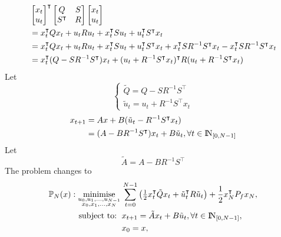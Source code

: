 \documentclass[a4paper,11pt,reqno]{amsart}
\newcommand{\N}{{\rm I\!N}}
\newcommand{\tran}{\intercal}
\DeclareMathOperator*{\minimise}{minimise}
\begin{document}
\begin{align}
    &
    \begin{bmatrix}
        x_t\\
        u_t
    \end{bmatrix}^{\tran}
    \begin{bmatrix}
        Q&S\\
        S^{\tran}&R
    \end{bmatrix}
    \begin{bmatrix}
        x_t\\
        u_t
    \end{bmatrix}\notag\\
    &=x_t^{\tran}Qx_t+u_tRu_t+x_t^{\tran}Su_t+u_t^{\tran}S^{\tran}x_t\notag\\
    &=x_t^{\tran}Qx_t+u_tRu_t+x_t^{\tran}Su_t+u_t^{\tran}S^{\tran}x_t+x_t^{\tran}SR^{-1}S^{\tran}x_t-x_t^{\tran}SR^{-1}S^{\tran}x_t\notag\\
    &=x_t^{\tran}(Q-SR^{-1}S^{\tran})x_t+(u_t+R^{-1}S^{\tran}x_t)^{\tran}R(u_t+R^{-1}S^{\tran}x_t)
    \label{eq:P_N_matrix_rewrite}
\end{align}
Let
\begin{equation}
    \begin{cases}
        \tilde{Q}=Q-SR^{-1}S^{\tran}\\
        \tilde{u}_t=u_t+R^{-1}S^{\tran}x_t
    \end{cases}
    \label{eq:tilde_Q_u}
\end{equation}
\begin{align}
    x_{t+1}&=Ax+B(\tilde{u}_t-R^{-1}S^{\tran}x_t)\notag\\
    &=(A-BR^{-1}S^{\tran})x_t+B\tilde{u}_t, \forall t\in\N_{[0, N-1]}
    \label{eq:tilde_x}
\end{align}
Let
\begin{equation}
    \tilde{A}=A-BR^{-1}S^{\tran}
    \label{eq:tilde_A}
\end{equation}
The problem changes to 
\begin{subequations}
    \begin{align}
        \mathbb{P}_N(x): \minimise_{\substack{u_0,u_1,\ldots,u_{N-1}\\ x_0,x_1,\ldots,x_N}} \,
         & \sum_{t=0}^{N-1}\left(\textstyle\frac{1}{2}
         x_t^{\tran}\tilde{Q}x_t+\tilde{u}_t^{\tran}R\tilde{u}_t\right) 
         +\frac{1}{2}x_N^{\tran}P_fx_N,
        \\
        \text{subject to: }\,
         & x_{t+1} = \tilde{A}x_t+B\tilde{u}_t, \forall t\in\N_{[0, N-1]},
        \\
         & x_{0} = x,
    \end{align}
\end{subequations}
\end{document}
